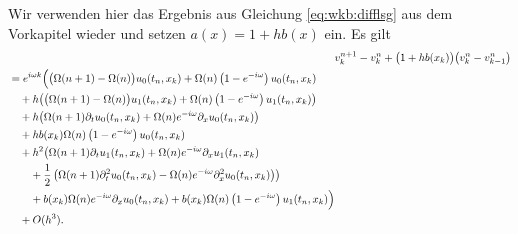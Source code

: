 Wir verwenden hier das Ergebnis aus Gleichung \eqref{eq:wkb:difflsg} aus dem Vorkapitel wieder und setzen $a(x) = 1 + hb(x)$ ein.
Es gilt
\begin{align}
\nonumber
&v^{n+1}_k - v^n_k + \bigl(1 + hb(x_k)\bigr) \bigl( v^n_k - v^n_{k-1} \bigr)\\
\begin{split}\label{eq:wkb:letzteglg}
&= e^{i \omega k} \Bigl(
\bigl(\Omega(n+1) - \Omega(n) \bigr) u_0(t_n, x_k) + \Omega(n) \left(1-e^{-i \omega}\right) u_0(t_n, x_k)\\
&\quad + h \bigl( \bigl(\Omega(n+1) - \Omega(n) \bigr) u_1(t_n, x_k) + \Omega(n) \left(1-e^{-i \omega}\right) u_1(t_n, x_k) \bigr)\\
&\quad + h \bigl( \Omega(n+1) \partial_t u_0(t_n, x_k) + \Omega(n) e^{-i \omega} \partial_x u_0(t_n, x_k) \bigr)\\
&\quad + h b(x_k) \Omega(n) \left(1-e^{-i \omega}\right) u_0(t_n, x_k)\\
&\quad + h^2 \bigl( \Omega(n+1) \partial_t u_1(t_n, x_k) + \Omega(n) e^{-i \omega} \partial_x u_1(t_n, x_k)\\
&\qquad + \frac{1}{2} \left( \Omega(n+1) \partial^2_t u_0(t_n, x_k) - \Omega(n) e^{-i \omega} \partial^2_x u_0(t_n, x_k) \right) \bigr)\\
&\qquad + b(x_k) \Omega(n) e^{-i \omega} \partial_x u_0(t_n, x_k) + b(x_k) \Omega(n) \left(1-e^{-i \omega}\right) u_1(t_n, x_k)
\Bigr)\\&\quad + O(h^3).
\end{split}
\end{align}
